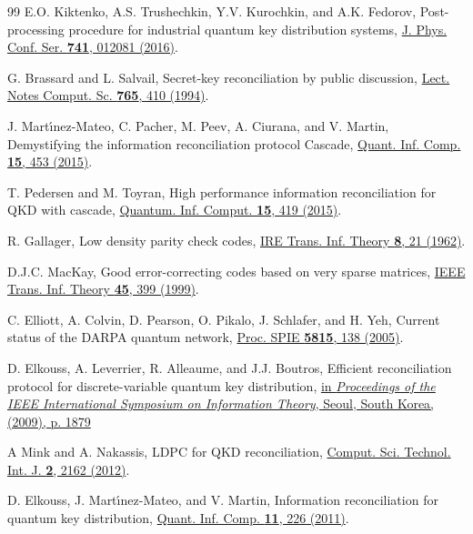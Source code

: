 \documentclass[aps,pra,twocolumn,amsmath,amssymb,nofootinbib,showpacs,superscriptaddress]{revtex4-1}
\begin{document}
\begin{thebibliography}{99}
E.O. Kiktenko, A.S. Trushechkin, Y.V. Kurochkin, and A.K. Fedorov,
Post-processing procedure for industrial quantum key distribution systems,
{\href{https://dx.doi.org/10.1088/1742-6596/741/1/012081}{J. Phys. Conf. Ser. {\bf 741}, 012081 (2016)}}.

G. Brassard and L. Salvail,
Secret-key reconciliation by public discussion,
{\href{https://dx.doi.org/10.1007/3-540-48285-7_35}
{Lect. Notes Comput. Sc. {\bf 765}, 410 (1994)}}.

J. Mart{\'{\i}}nez{-}Mateo, C. Pacher, M. Peev, A. Ciurana, and V. Martin,
Demystifying the information reconciliation protocol Cascade,
{\href{https://dblp2.uni-trier.de/db/journals/qic/qic15}{Quant. Inf. Comp. {\bf 15}, 453 (2015)}}.

T. Pedersen and M. Toyran,
High performance information reconciliation for QKD with cascade,
{\href{https://dblp2.uni-trier.de/db/journals/qic/qic15}{Quantum. Inf. Comput. {\bf 15}, 419 (2015)}}.

R. Gallager, 
Low density parity check codes,
{\href{https://coding.yonsei.ac.kr/gallager-ldpc.pdf}{IRE Trans. Inf. Theory {\bf 8}, 21 (1962)}}.

D.J.C. MacKay,
Good error-correcting codes based on very sparse matrices,
{\href{https://dx.doi.org/10.1109/18.748992}{IEEE Trans. Inf. Theory {\bf 45}, 399 (1999)}}.

C. Elliott, A. Colvin, D. Pearson, O. Pikalo, J. Schlafer, and H. Yeh,
Current status of the DARPA quantum network,
{\href{https://dx.doi.org/10.1117/12.606489}{Proc. SPIE {\bf 5815}, 138 (2005)}}.

D. Elkouss, A. Leverrier, R. Alleaume, and J.J. Boutros,
Efficient reconciliation protocol for discrete-variable quantum key distribution,
{\href{https://dx.doi.org/10.1109/ISIT.2009.5205475}
{in {\it Proceedings of the IEEE International Symposium on Information Theory}, Seoul, South Korea, (2009), p. 1879}} 

A Mink and A. Nakassis, 
LDPC for QKD reconciliation,
{\href{https://researchpub.org/journal/cstij/number/vol2-no2/vol2-no2-1.pdf}{Comput. Sci. Technol. Int. J. {\bf 2}, 2162 (2012)}}.

D. Elkouss, J. Mart{\'{\i}}nez{-}Mateo, and V. Martin,
Information reconciliation for quantum key distribution,
{\href{https://dblp2.uni-trier.de/db/journals/qic/qic11.html}{Quant. Inf. Comp. {\bf 11}, 226 (2011)}}.


\end{thebibliography}
\end{document}
